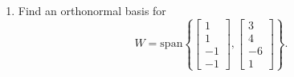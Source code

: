 \documentclass[14pt]{article}
\begin{document}
\begin{enumerate}
\item Find an orthonormal basis for 
\[
W = \text{span}\left\lbrace\left[\begin{array}{c} 1 \\ 1 \\ -1 \\ -1 \end{array}\right],
\left[\begin{array}{c} 3 \\ 4 \\ -6 \\ 1  \end{array}\right]\right\rbrace.
\]




























\end{enumerate}
\end{document}
